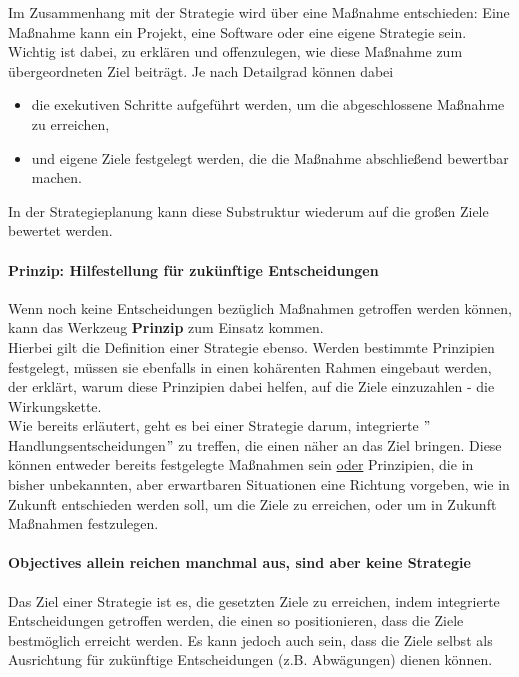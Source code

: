 Im Zusammenhang mit der Strategie wird über eine Maßnahme entschieden: Eine Maßnahme kann ein Projekt, eine Software oder eine eigene Strategie sein. Wichtig ist dabei, zu erklären und offenzulegen, wie diese Maßnahme zum übergeordneten Ziel beiträgt. Je nach Detailgrad können dabei

\begin{itemize}
	\item die exekutiven Schritte aufgeführt werden, um die abgeschlossene Maßnahme zu erreichen,
	\item und eigene Ziele festgelegt werden, die die Maßnahme abschließend bewertbar machen.
\end{itemize}

In der Strategieplanung kann diese Substruktur wiederum auf die großen Ziele bewertet werden.

\paragraph{Prinzip: Hilfestellung für zukünftige Entscheidungen} \label{Rubic:Prinzip}

Wenn noch keine Entscheidungen bezüglich Maßnahmen getroffen werden können, kann das Werkzeug \textbf{Prinzip} zum Einsatz kommen.\\

Hierbei gilt die Definition einer Strategie ebenso. Werden bestimmte Prinzipien festgelegt, müssen sie ebenfalls in einen kohärenten Rahmen eingebaut werden, der erklärt, warum diese Prinzipien dabei helfen, auf die Ziele einzuzahlen - die Wirkungskette.\\

Wie bereits erläutert, geht es bei einer Strategie darum, integrierte $"$Handlungsentscheidungen$"$ zu treffen, die einen näher an das Ziel bringen. Diese können entweder bereits festgelegte Maßnahmen sein \underline{oder} Prinzipien, die in bisher unbekannten, aber erwartbaren Situationen eine Richtung vorgeben, wie in Zukunft entschieden werden soll, um die Ziele zu erreichen, oder um in Zukunft Maßnahmen festzulegen.

\paragraph{Objectives allein reichen manchmal aus, sind aber keine Strategie}

Das Ziel einer Strategie ist es, die gesetzten Ziele zu erreichen, indem integrierte Entscheidungen getroffen werden, die einen so positionieren, dass die Ziele bestmöglich erreicht werden. Es kann jedoch auch sein, dass die Ziele selbst als Ausrichtung für zukünftige Entscheidungen (z.B. Abwägungen) dienen können.\\

